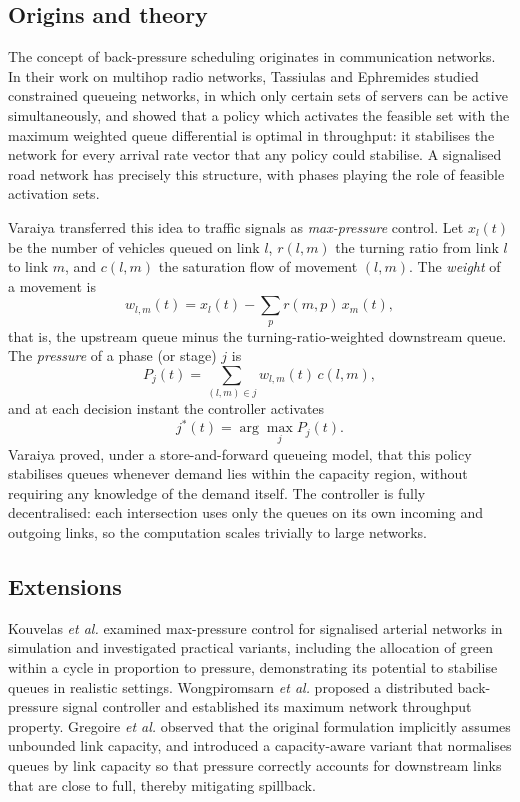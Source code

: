 \subsection{Origins and theory}
The concept of back-pressure scheduling originates in communication networks. In their
work on multihop radio networks, Tassiulas and Ephremides \cite{tassiulas1992} studied constrained queueing networks, in which only certain sets of servers can be active simultaneously, and
showed that a policy which activates the feasible set with the maximum weighted queue differential
is optimal in throughput: it stabilises the network for every arrival rate vector that any policy could stabilise.
A signalised road network has precisely this structure, with phases playing the role of feasible activation sets.

Varaiya \cite{varaiya2013maxpressure} transferred this idea to traffic signals as \emph{max-pressure} control.
Let $x_{l}(t)$ be the number of vehicles queued on link $l$, $r(l,m)$ the turning ratio from link $l$ to link $m$,
and $c(l,m)$ the saturation flow of movement $(l,m)$. The \emph{weight} of a movement is
\begin{equation}
  w_{l,m}(t) = x_l(t) - \sum_{p} r(m,p)\, x_m(t),
  \label{eq:mp-weight}
\end{equation}
that is, the upstream queue minus the turning-ratio-weighted downstream queue. The \emph{pressure} of a phase
(or stage) $j$ is
\begin{equation}
  P_j(t) = \sum_{(l,m)\in j} w_{l,m}(t)\, c(l,m),
  \label{eq:mp-pressure}
\end{equation}
and at each decision instant the controller activates
\begin{equation}
  j^\ast(t) = \arg\max_{j} P_j(t).
  \label{eq:mp-argmax}
\end{equation}
Varaiya proved, under a store-and-forward queueing model, that this policy stabilises queues whenever demand lies
within the capacity region, without requiring any knowledge of the demand itself. The controller is fully
decentralised: each intersection uses only the queues on its own incoming and outgoing links, so the
computation scales trivially to large networks.

\subsection{Extensions}
Kouvelas \emph{et al.} \cite{kouvelas2014maxpressure} examined max-pressure control for signalised arterial
networks in simulation and investigated practical variants, including the allocation of green within a cycle in
proportion to pressure, demonstrating its potential to stabilise queues in realistic settings. Wongpiromsarn
\emph{et al.} \cite{wongpiromsarn2012distributed} proposed a distributed back-pressure signal controller and
established its maximum network throughput property. Gregoire \emph{et al.} \cite{gregoire2015capacity} observed
that the original formulation implicitly assumes unbounded link capacity, and introduced a capacity-aware
variant that normalises queues by link capacity so that pressure correctly accounts for downstream links that
are close to full, thereby mitigating spillback.

